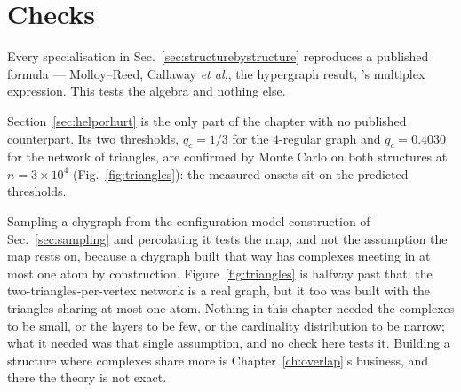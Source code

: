 \section{Checks}
\label{sec:percolation-checks}

Every specialisation in Sec.~\ref{sec:structurebystructure} reproduces a
published formula --- Molloy--Reed, Callaway \emph{et al.}, the hypergraph
result, \citeauthor{sun2021}'s multiplex expression. This tests the algebra and
nothing else.

Section~\ref{sec:helporhurt} is the only part of the chapter with no published
counterpart. Its two thresholds, $q_{c}=1/3$ for the $4$-regular graph and
$q_{c}=0.4030$ for the network of triangles, are confirmed by Monte Carlo on
both structures at $n=3\times10^{4}$ (Fig.~\ref{fig:triangles}): the measured
onsets sit on the predicted thresholds.

Sampling a chygraph from the configuration-model construction of
Sec.~\ref{sec:sampling} and percolating it tests the map, and not the assumption
the map rests on, because a chygraph built that way has complexes meeting in at
most one atom by construction. Figure~\ref{fig:triangles} is halfway past that:
the two-triangles-per-vertex network is a real graph, but it too was built with
the triangles sharing at most one atom. Nothing in this chapter needed the
complexes to be small, or the layers to be few, or the cardinality distribution
to be narrow; what it needed was that single assumption, and no check here tests
it. Building a structure where complexes share more is
Chapter~\ref{ch:overlap}'s business, and there the theory is not exact.

